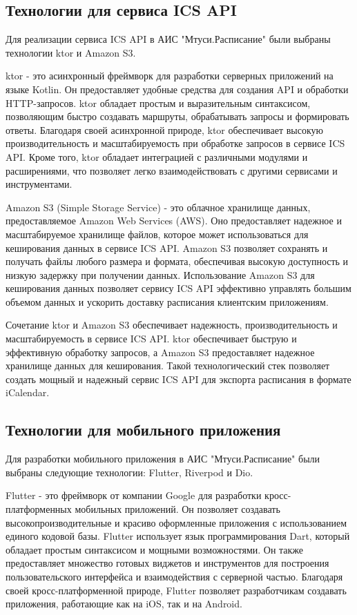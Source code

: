 \subsection{Технологии для сервиса ICS API}
Для реализации сервиса ICS API в АИС "Мтуси.Расписание" были выбраны технологии ktor и Amazon S3.

ktor - это асинхронный фреймворк для разработки серверных приложений на языке Kotlin.
Он предоставляет удобные средства для создания API и обработки HTTP-запросов.
ktor обладает простым и выразительным синтаксисом, позволяющим быстро создавать маршруты,
обрабатывать запросы и формировать ответы. Благодаря своей асинхронной природе,
ktor обеспечивает высокую производительность и масштабируемость при обработке запросов в сервисе ICS API.
Кроме того, ktor обладает интеграцией с различными модулями и расширениями, что позволяет легко взаимодействовать
с другими сервисами и инструментами.

Amazon S3 (Simple Storage Service) - это облачное хранилище данных, предоставляемое Amazon Web Services (AWS).
Оно предоставляет надежное и масштабируемое хранилище файлов, которое может использоваться для кеширования данных в сервисе ICS API.
Amazon S3 позволяет сохранять и получать файлы любого размера и формата,
обеспечивая высокую доступность и низкую задержку при получении данных.
Использование Amazon S3 для кеширования данных позволяет сервису ICS API эффективно управлять большим
объемом данных и ускорить доставку расписания клиентским приложениям.

Сочетание ktor и Amazon S3 обеспечивает надежность, производительность и масштабируемость в сервисе ICS API.
ktor обеспечивает быструю и эффективную обработку запросов, а Amazon S3 предоставляет надежное хранилище данных для кеширования.
Такой технологический стек позволяет создать мощный и надежный сервис ICS API для экспорта расписания в формате iCalendar.

\subsection{Технологии для мобильного приложения}

Для разработки мобильного приложения в АИС "Мтуси.Расписание" были выбраны следующие технологии: Flutter, Riverpod и Dio.

Flutter - это фреймворк от компании Google для разработки кросс-платформенных мобильных приложений.
Он позволяет создавать высокопроизводительные и красиво оформленные приложения с использованием единого кодовой базы.
Flutter использует язык программирования Dart, который обладает простым синтаксисом и мощными возможностями.
Он также предоставляет множество готовых виджетов и инструментов для построения пользовательского интерфейса
и взаимодействия с серверной частью. Благодаря своей кросс-платформенной природе,
Flutter позволяет разработчикам создавать приложения, работающие как на iOS, так и на Android.

